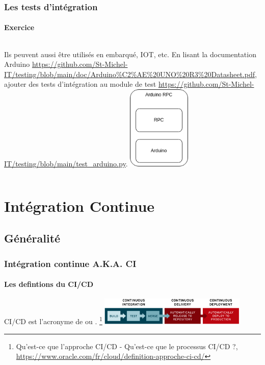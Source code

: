 \documentclass{beamer}
\begin{document}
    \begin{frame}
        \transdissolve
        \frametitle{Les tests d'intégration}
        \framesubtitle{Exercice \execcounterdispinc{}}
        \begin{columns}
            Ils peuvent aussi être utilisés en embarqué, IOT, etc.
            \bigbreak
            En lisant la documentation Arduino  \url{https://github.com/St-Michel-IT/testing/blob/main/doc/Arduino\%C2\%AE\%20UNO\%20R3\%20Datasheet.pdf}, ajouter des tests d'intégration au module de test \url{https://github.com/St-Michel-IT/testing/blob/main/test_arduino.py}.
            \centering
            \includegraphics[width=3cm]{image/arduino-rpc-stack.drawio}
        \end{columns}
    \end{frame}


    \section{Intégration Continue}\label{sec:ci}

    \subsection{Généralité}\label{subsec:ci-general}
    \begin{frame}
        \frametitle{Intégration continue A.K.A. CI}
        \framesubtitle{Les defintions du CI/CD}
        \transdissolve
        CI/CD est l'acronyme de  ou .
        \bigbreak
        \footnote{Qu'est-ce que l'approche CI/CD - Qu’est-ce que le processus CI/CD ?, \url{https://www.oracle.com/fr/cloud/definition-approche-ci-cd/}}
        \bigbreak
        \centering
        \includegraphics[width=7cm]{image/ci-cd-flow.png}
    \end{frame}
\end{document}
